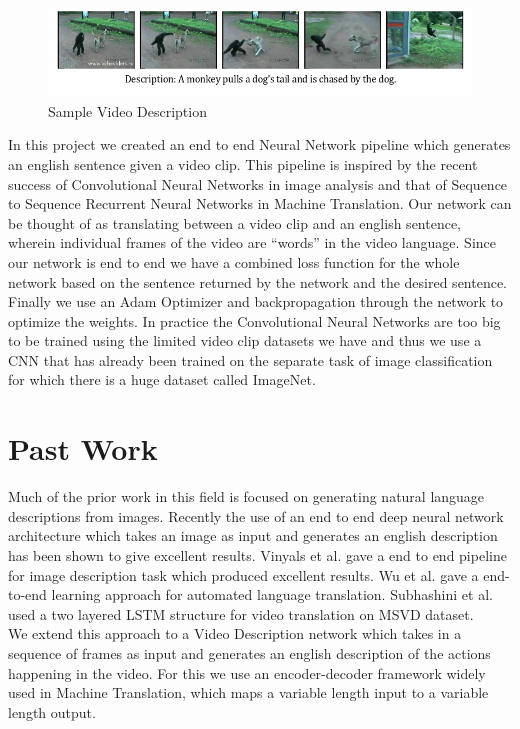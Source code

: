 \documentclass[12pt]{article}
\begin{document}
		\begin{figure}[ht!]
		\centering
		\includegraphics[width=1.0\textwidth]{description.png}
		\caption{Sample Video Description\label{fig0}}
		\end{figure}		
In this project we created an end to end Neural Network pipeline which generates an english sentence given a video clip. This pipeline is inspired by the recent success of Convolutional Neural Networks in image analysis and that of Sequence to Sequence Recurrent Neural Networks in Machine Translation. Our network can be thought of as translating between a video clip and an english sentence, wherein individual frames of the video are ``words'' in the video language. Since our network is end to end we have a combined loss function for the whole network based on the sentence returned by the network and the desired sentence. Finally we use an Adam Optimizer and backpropagation through the network to optimize the weights. In practice the Convolutional Neural Networks are too big to be trained using the limited video clip datasets we have and thus we use a CNN that has already been trained on the separate task of image classification for which there is a huge dataset called ImageNet.

	\section{Past Work}

	Much of the prior work in this field is focused on generating natural language descriptions from images. Recently the use of an end to end deep neural network architecture which takes an image as input and generates an english description has  been shown to give excellent results. Vinyals et al.\cite{showandtell} gave a end to end pipeline for image description
	task which produced excellent results. Wu et al.\cite{gnmt} gave a end-to-end learning approach for automated language
	translation. Subhashini et al.\cite{s2vt} used a two layered LSTM\cite{ltms} structure for video translation on MSVD dataset.\\
	We extend this approach to a Video Description network which takes in a sequence of frames as input and generates an english description of the actions happening in the video. For this we use an encoder-decoder framework widely used in Machine Translation\cite{gnmt}, which maps a variable length input to a variable length output.
\end{document}
